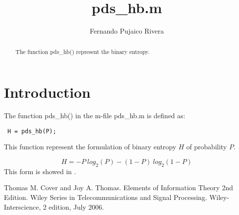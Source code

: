 \documentclass[a4paper,10pt]{article}
\title{pds\_hb.m}
\author{Fernando Pujaico Rivera}
\begin{document}
\maketitle
\begin{abstract}
The function pds\_hb() represent the binary entropy.
\end{abstract}

\section{Introduction}
The function pds\_hb() in the m-file pds\_hb.m is defined as:
\lstset{language=octave}%
\begin{lstlisting}
 H = pds_hb(P);
\end{lstlisting}
This function represent the formulation of binary entropy $H$ of probability $P$.

\begin{equation}\label{eq:hb}
H = -P~log_2(P) -(1-P)~log_2(1-P)
\end{equation}
This form is showed in \cite{thomas}.

 \begin{thebibliography}{99}
 
Thomas M. Cover and Joy A. Thomas. Elements of Information Theory 2nd Edition. 
Wiley Series in Telecommunications and Signal Processing. 
Wiley-Interscience, 2 edition, July 2006.



 \end{thebibliography} 
\end{document}
